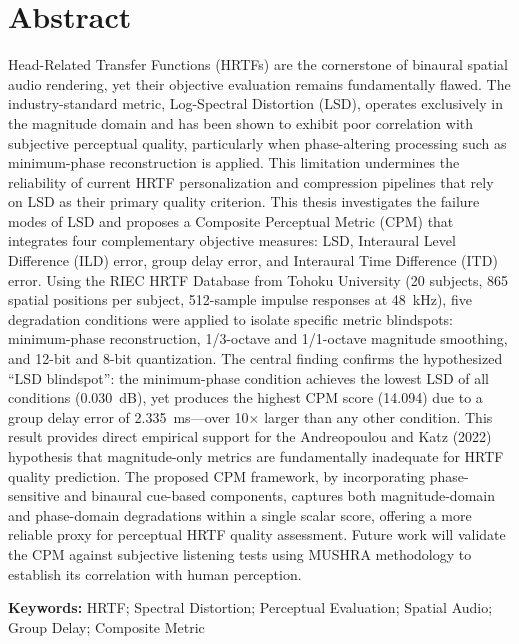 \documentclass[12pt,a4paper]{article}
\begin{document}
\section*{Abstract}

Head-Related Transfer Functions (HRTFs) are the cornerstone of binaural spatial audio rendering, yet their objective evaluation remains fundamentally flawed. The industry-standard metric, Log-Spectral Distortion (LSD), operates exclusively in the magnitude domain and has been shown to exhibit poor correlation with subjective perceptual quality, particularly when phase-altering processing such as minimum-phase reconstruction is applied. This limitation undermines the reliability of current HRTF personalization and compression pipelines that rely on LSD as their primary quality criterion. This thesis investigates the failure modes of LSD and proposes a Composite Perceptual Metric (CPM) that integrates four complementary objective measures: LSD, Interaural Level Difference (ILD) error, group delay error, and Interaural Time Difference (ITD) error. Using the RIEC HRTF Database from Tohoku University (20 subjects, 865 spatial positions per subject, 512-sample impulse responses at 48~kHz), five degradation conditions were applied to isolate specific metric blindspots: minimum-phase reconstruction, 1/3-octave and 1/1-octave magnitude smoothing, and 12-bit and 8-bit quantization. The central finding confirms the hypothesized ``LSD blindspot'': the minimum-phase condition achieves the lowest LSD of all conditions (0.030~dB), yet produces the highest CPM score (14.094) due to a group delay error of 2.335~ms---over 10$\times$ larger than any other condition. This result provides direct empirical support for the Andreopoulou and Katz (2022) hypothesis that magnitude-only metrics are fundamentally inadequate for HRTF quality prediction. The proposed CPM framework, by incorporating phase-sensitive and binaural cue-based components, captures both magnitude-domain and phase-domain degradations within a single scalar score, offering a more reliable proxy for perceptual HRTF quality assessment. Future work will validate the CPM against subjective listening tests using MUSHRA methodology to establish its correlation with human perception.

\vspace{0.5cm}

\textbf{Keywords:} HRTF; Spectral Distortion; Perceptual Evaluation; Spatial Audio; Group Delay; Composite Metric
\end{document}
